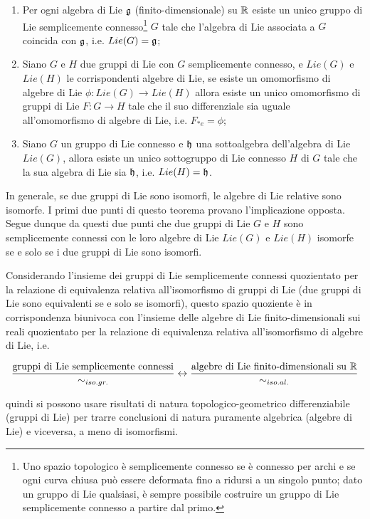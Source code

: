 \begin{theorem}\hfill\break
	\begin{enumerate}
		\item Per ogni algebra di Lie $ \mathfrak{g} $ (finito-dimensionale) su $ \mathbb{R} $ esiste un unico gruppo di Lie semplicemente connesso\footnote{%
			Uno spazio topologico è semplicemente connesso se è connesso per archi e se ogni curva chiusa può essere deformata fino a ridursi a un singolo punto; dato un gruppo di Lie qualsiasi, è sempre possibile costruire un gruppo di Lie semplicemente connesso a partire dal primo.%
		} $ G $ tale che l'algebra di Lie associata a $ G $ coincida con $ \mathfrak{g} $, i.e. $ Lie(G) = \mathfrak{g} $;
		
		\item Siano $ G $ e $ H $ due gruppi di Lie con $ G $ semplicemente connesso, e $ Lie(G) $ e $ Lie(H) $ le corrispondenti algebre di Lie, se esiste un omomorfismo di algebre di Lie $ \phi : Lie(G) \to Lie(H) $ allora esiste un unico omomorfismo di gruppi di Lie $ F : G \to H $ tale che il suo differenziale sia uguale all'omomorfismo di algebre di Lie, i.e. $ F_{*e} = \phi $;
		
		\item Siano $ G $ un gruppo di Lie connesso e $ \mathfrak{h} $ una sottoalgebra dell'algebra di Lie $ Lie(G) $, allora esiste un unico sottogruppo di Lie connesso $ H $ di $ G $ tale che la sua algebra di Lie sia $ \mathfrak{h} $, i.e. $ Lie(H) = \mathfrak{h} $.
	\end{enumerate}
\end{theorem}

\begin{remark}
	In generale, se due gruppi di Lie sono isomorfi, le algebre di Lie relative sono isomorfe. I primi due punti di questo teorema provano l'implicazione opposta. Segue dunque da questi due punti che due gruppi di Lie $ G $ e $ H $ sono semplicemente connessi con le loro algebre di Lie $ Lie(G) $ e $ Lie(H) $ isomorfe se e solo se i due gruppi di Lie sono isomorfi.
\end{remark}

\begin{theorem}
	Considerando l'insieme dei gruppi di Lie semplicemente connessi quozientato per la relazione di equivalenza relativa all'isomorfismo di gruppi di Lie (due gruppi di Lie sono equivalenti se e solo se isomorfi), questo spazio quoziente è in corrispondenza biunivoca con l'insieme delle algebre di Lie finito-dimensionali sui reali quozientato per la relazione di equivalenza relativa all'isomorfismo di algebre di Lie, i.e.
	
	\begin{equation}
		\dfrac{\text{gruppi di Lie semplicemente connessi}}{\sim_{iso.gr.}} %
		\leftrightarrow %
		\dfrac{\text{algebre di Lie finito-dimensionali su } \R}{\sim_{iso.al.}}
	\end{equation}
	
	quindi si possono usare risultati di natura topologico-geometrico differenziabile (gruppi di Lie) per trarre conclusioni di natura puramente algebrica (algebre di Lie) e viceversa, a meno di isomorfismi.
\end{theorem}

